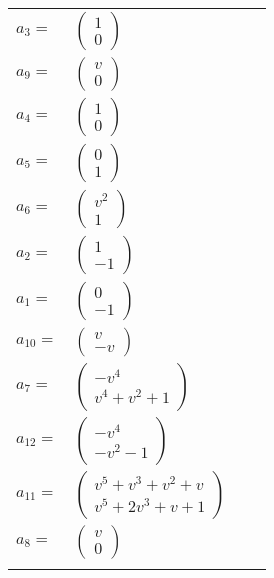 \documentclass[1p]{elsarticle_modified}
\theoremstyle{definition}
\begin{document}
\begin{tabular}{m{7pt} m{180pt} m{7pt} m{180pt} }
\flushright $a_{3}=$&$\begin{pmatrix}1\\0\end{pmatrix}$ \\
\flushright $a_{9}=$&$\begin{pmatrix}v\\0\end{pmatrix}$ \\
\flushright $a_{4}=$&$\begin{pmatrix}1\\0\end{pmatrix}$ \\
\flushright $a_{5}=$&$\begin{pmatrix}0\\1\end{pmatrix}$ \\
\flushright $a_{6}=$&$\begin{pmatrix}v^2\\1\end{pmatrix}$ \\
\flushright $a_{2}=$&$\begin{pmatrix}1\\-1\end{pmatrix}$ \\
\flushright $a_{1}=$&$\begin{pmatrix}0\\-1\end{pmatrix}$ \\
\flushright $a_{10}=$&$\begin{pmatrix}v\\- v\end{pmatrix}$ \\
\flushright $a_{7}=$&$\begin{pmatrix}- v^4\\v^4+v^2+1\end{pmatrix}$ \\
\flushright $a_{12}=$&$\begin{pmatrix}- v^4\\- v^2-1\end{pmatrix}$ \\
\flushright $a_{11}=$&$\begin{pmatrix}v^5+v^3+v^2+v\\v^5+2 v^3+v+1\end{pmatrix}$ \\
\flushright $a_{8}=$&$\begin{pmatrix}v\\0\end{pmatrix}$\\&\end{tabular}
\end{document}

